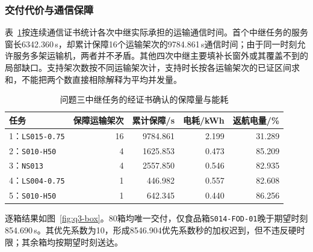 \subsubsection{交付代价与通信保障}
表~\ref{tab:q3-relay-support}按连续通信证书统计各次中继实际承担的运输通信时间。首个中继任务的服务窗长6342.360\,s，却累计保障16个运输架次的9784.861\,s通信时间；由于同一时刻允许服务多架运输机，两者并不矛盾。其他四次中继主要填补长窗外或其覆盖不到的局部缺口。支持架次数按不同运输架次计，支持时长按各运输架次的已证区间求和，不能把两个数直接相除解释为平均并发量。
\begin{table}[htbp]
\centering\small
\caption{问题三中继任务的经证书确认的保障量与能耗}
\label{tab:q3-relay-support}
\begin{tabular}{@{}lrrrr@{}}
\toprule
任务 & 保障运输架次 & 累计保障/s & 电耗/kWh & 返航电量/\%\\
\midrule
1：\texttt{LS015-0.75} & 16 & 9784.861 & 2.199 & 31.289\\
2：\texttt{S010-H50} & 4 & 1625.853 & 0.473 & 85.209\\
3：\texttt{NS013} & 4 & 2557.850 & 0.546 & 82.935\\
4：\texttt{LS004-0.75} & 1 & 446.982 & 0.557 & 82.608\\
5：\texttt{S010-H50} & 1 & 642.345 & 0.440 & 86.256\\
\bottomrule
\end{tabular}
\end{table}

逐箱结果如图~\ref{fig:q3-box}。80箱均唯一交付，仅食品箱\texttt{S014-\allowbreak{}FOD-01}晚于期望时刻854.690\,s。其优先系数为10，形成8546.904优先系数秒的加权迟到，但不违反硬时限；其余箱均按期望时刻送达。


